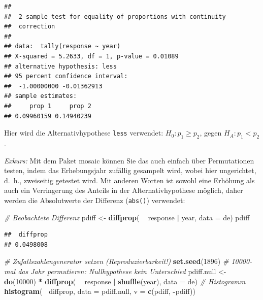 \documentclass[12pt,ngerman,paper=a4,pagesize,DIV=13]{scrreprt}
\newenvironment{Shaded}{\begin{snugshade}}{\end{snugshade}}
\newcommand{\CommentTok}[1]{\textcolor[rgb]{0.56,0.35,0.01}{\textit{#1}}}
\newcommand{\DataTypeTok}[1]{\textcolor[rgb]{0.13,0.29,0.53}{#1}}
\newcommand{\DecValTok}[1]{\textcolor[rgb]{0.00,0.00,0.81}{#1}}
\newcommand{\KeywordTok}[1]{\textcolor[rgb]{0.13,0.29,0.53}{\textbf{#1}}}
\newcommand{\NormalTok}[1]{#1}
\newcommand{\OperatorTok}[1]{\textcolor[rgb]{0.81,0.36,0.00}{\textbf{#1}}}
\newcommand{\StringTok}[1]{\textcolor[rgb]{0.31,0.60,0.02}{#1}}
\begin{document}
\begin{verbatim}
## 
##  2-sample test for equality of proportions with continuity
##  correction
## 
## data:  tally(response ~ year)
## X-squared = 5.2633, df = 1, p-value = 0.01089
## alternative hypothesis: less
## 95 percent confidence interval:
##  -1.00000000 -0.01362913
## sample estimates:
##     prop 1     prop 2 
## 0.09960159 0.14940239
\end{verbatim}

Hier wird die Alternativhypothese \texttt{less} verwendet:
\(H_0: p_1 \geq p_2\), gegen \(H_A: p_1<p_2\).

\emph{Exkurs:} Mit dem Paket mosaic können Sie das auch einfach über
Permutationen testen, indem das Erhebungsjahr zufällig gesampelt wird,
wobei hier ungerichtet, d.~h., zweiseitig getestet wird. Mit anderen
Worten ist sowohl eine Erhöhung als auch ein Verringerung des Anteils in
der Alternativhypothese möglich, daher werden die Absolutwerte der
Differenz (\texttt{abs()}) verwendet:

\begin{Shaded}
\begin{Highlighting}[]
\CommentTok{# Beobachtete Differenz}
\NormalTok{pdiff <-}\StringTok{ }\KeywordTok{diffprop}\NormalTok{( }\OperatorTok{~}\StringTok{ }\NormalTok{response }\OperatorTok{|}\StringTok{ }\NormalTok{year, }\DataTypeTok{data =}\NormalTok{ de)}
\NormalTok{pdiff}
\end{Highlighting}
\end{Shaded}

\begin{verbatim}
##  diffprop 
## 0.0498008
\end{verbatim}

\begin{Shaded}
\begin{Highlighting}[]
\CommentTok{# Zufallszahlengenerator setzen (Reproduzierbarkeit!)}
\KeywordTok{set.seed}\NormalTok{(}\DecValTok{1896}\NormalTok{)}
\CommentTok{# 10000-mal das Jahr permutieren: Nullhypothese kein Unterschied}
\NormalTok{pdiff.null <-}\StringTok{ }\KeywordTok{do}\NormalTok{(}\DecValTok{10000}\NormalTok{) }\OperatorTok{*}\StringTok{ }\KeywordTok{diffprop}\NormalTok{( }\OperatorTok{~}\StringTok{ }\NormalTok{response }\OperatorTok{|}\StringTok{ }\KeywordTok{shuffle}\NormalTok{(year), }\DataTypeTok{data =}\NormalTok{ de)}
\CommentTok{# Histogramm}
\KeywordTok{histogram}\NormalTok{(}\OperatorTok{~}\StringTok{ }\NormalTok{diffprop, }\DataTypeTok{data =}\NormalTok{ pdiff.null, }\DataTypeTok{v =} \KeywordTok{c}\NormalTok{(pdiff, }\OperatorTok{-}\NormalTok{pdiff))}
\end{Highlighting}
\end{Shaded}
\end{document}
